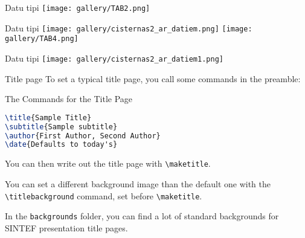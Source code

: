 \documentclass{beamer}
\begin{document}
    \begin{frame}[fragile]{Datu tipi}
    \texttt{[image: gallery/TAB2.png]}
    \end{frame}

     \begin{frame}[fragile]{Datu tipi}
     \hspace*{1cm}
     \vspace*{-1.5cm}
    \texttt{[image: gallery/cisternas2\_ar\_datiem.png]} 
     \vspace*{0.3cm}
     \hspace*{1cm}
    \texttt{[image: gallery/TAB4.png]}
    \end{frame}


                \begin{frame}[fragile]{Datu tipi}
     \hspace*{1cm}
     \vspace*{0.3cm}
    \texttt{[image: gallery/cisternas2\_ar\_datiem1.png]}
    \end{frame}

    \begin{frame}[fragile]{Title page}
        To set a typical title page, you call some commands in the preamble:
        \begin{block}{The Commands for the Title Page}
            \begin{lstlisting}[language=TeX]
\title{Sample Title}
\subtitle{Sample subtitle}
\author{First Author, Second Author}
\date{Defaults to today's}\end{lstlisting}
        \end{block}
        You can then write out the title page with \verb|\maketitle|.

        You can set a different background image than the default one with the \verb|\titlebackground| command, set before \verb|\maketitle|.

        In the \texttt{backgrounds} folder, you can find a lot of standard backgrounds for SINTEF presentation title pages.
    \end{frame}
\end{document}
